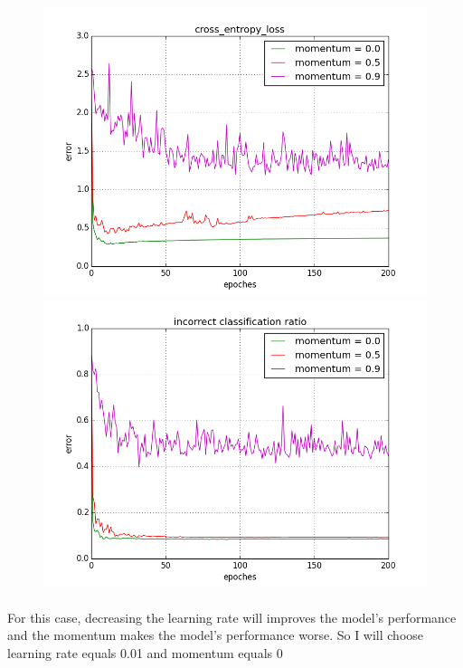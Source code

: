 \documentclass[twoside]{article}
\begin{document}
\begin{figure}[h]
{\begin{minipage}[b]{0.4\textwidth}
\includegraphics[width=1\textwidth]{images/problem_d_momentum_cross_entropy} \\
\includegraphics[width=1\textwidth]{images/problem_d_momentum_IC}
\end{minipage}

}
\end{figure}

\paragraph{} For this case, decreasing the learning rate will improves the model's performance and the momentum makes the model's performance worse. So I will choose learning rate equals 0.01 and momentum equals 0
\end{document}
